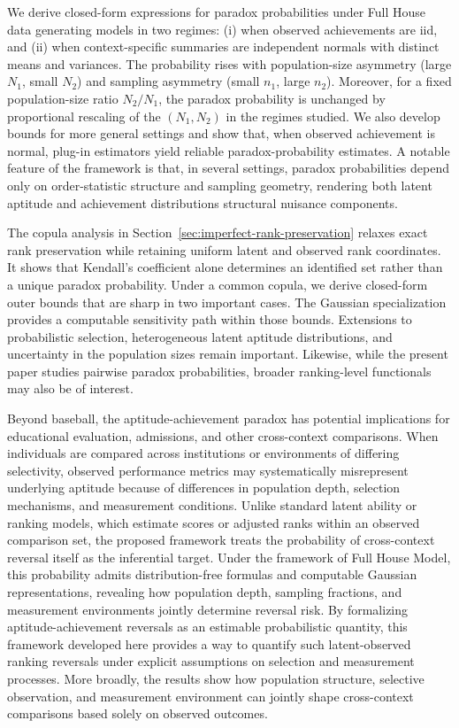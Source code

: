\documentclass[12pt]{article}
\begin{document}
We derive closed-form expressions for paradox probabilities under Full House data generating models in two regimes: (i) when observed achievements are iid, and (ii) when context-specific summaries are independent normals with distinct means and variances. The probability rises with population-size asymmetry (large $N_1$, small $N_2$) and sampling asymmetry (small $n_1$, large $n_2$). Moreover, for a fixed population-size ratio $N_2/N_1$, the paradox probability is unchanged by proportional rescaling of the $(N_1,N_2)$ in the regimes studied. We also develop bounds for more general settings and show that, when observed achievement is normal, plug-in estimators yield reliable paradox-probability estimates. A notable feature of the framework is that, in several settings, paradox probabilities depend only on order-statistic structure and sampling geometry, rendering both latent aptitude and achievement distributions structural nuisance components.

The copula analysis in Section~\ref{sec:imperfect-rank-preservation} relaxes exact rank preservation while retaining uniform latent and observed rank coordinates. It shows that Kendall's coefficient alone determines an identified set rather than a unique paradox probability. Under a common copula, we derive closed-form outer bounds that are sharp in two important cases. The Gaussian specialization provides a computable sensitivity path within those bounds. Extensions to probabilistic selection, heterogeneous latent aptitude distributions, and uncertainty in the population sizes remain important. Likewise, while the present paper studies pairwise paradox probabilities, broader ranking-level functionals may also be of interest.

Beyond baseball, the aptitude-achievement paradox has potential implications for educational evaluation, admissions, and other cross-context comparisons. When individuals are compared across institutions or environments of differing selectivity, observed performance metrics may systematically misrepresent underlying aptitude because of differences in population depth, selection mechanisms, and measurement conditions. Unlike standard latent ability or ranking models, which estimate scores or adjusted ranks within an observed comparison set, the proposed framework treats the probability of cross-context reversal itself as the inferential target. Under the framework of Full House Model, this probability admits distribution-free formulas and computable Gaussian representations, revealing how population depth, sampling fractions, and measurement environments jointly determine reversal risk. By formalizing aptitude-achievement reversals as an estimable probabilistic quantity, this framework developed here provides a way to quantify such latent-observed ranking reversals under explicit assumptions on selection and measurement processes. More broadly, the results show how population structure, selective observation, and measurement environment can jointly shape cross-context comparisons based solely on observed outcomes.
\end{document}
